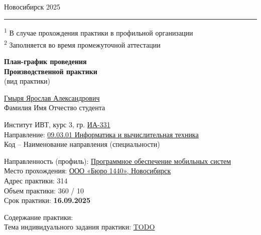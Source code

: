 \vspace{0.8cm}

\begin{center}
Новосибирск 2025
\end{center}

\vspace{0.4cm}

\noindent\rule{6cm}{0.4pt}

{\footnotesize
\textsuperscript{1} В случае прохождения практики в профильной организации\\
\textsuperscript{2} Заполняется во время промежуточной аттестации
}

\vfill
\newpage

\begin{center}
\textbf{План-график проведения}\\[0.2em]
\textbf{Производственной практики}\\[0.3em]
{\footnotesize (вид практики)}
\end{center}

\vspace{0.5cm}

\underline{Гмыря Ярослав Александрович}\\
{\footnotesize Фамилия Имя Отчество студента}

\vspace{0.3cm}

Институт ИВТ, курс 3, гр. \underline{ИА-331}\\[0.2em]
Направление: \underline{09.03.01 Информатика и вычислительная техника}\\
{\footnotesize Код – Наименование направления (специальности)}

\vspace{0.4cm}

Направленность (профиль): \underline{Программное обеспечение мобильных систем}\\
Место прохождения: \underline{ООО «Бюро 1440», Новосибирск}\\
Адрес практики: 314\\
Объем практики: 360 / 10\\
Срок практики: \textbf{16.09.2025}

\vspace{0.6cm}

Содержание практики:\\
Тема индивидуального задания практики: \underline{TODO}

\vspace{0.6cm}

